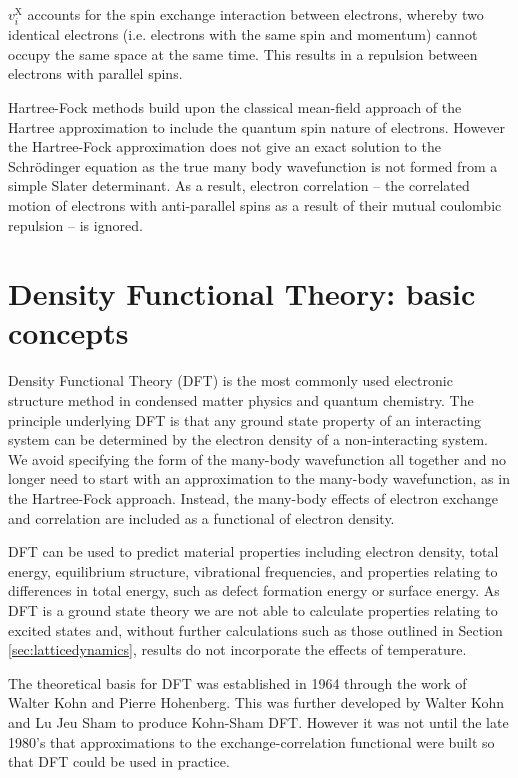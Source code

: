 $v_i^\textrm{X}$ accounts for the spin exchange interaction between electrons, whereby two identical electrons (i.e. electrons with the same spin and momentum) cannot occupy the same space at the same time. This results in a repulsion between electrons with parallel spins.

Hartree-Fock methods build upon the classical mean-field approach of the Hartree approximation to include the quantum spin nature of electrons.
However the Hartree-Fock approximation does not give an exact solution to the Schr\"{o}dinger equation as the true many body wavefunction is not formed from a simple Slater determinant. As a result, electron correlation -- the correlated motion of electrons with anti-parallel spins as a result of their mutual coulombic repulsion -- is ignored.



\section{Density Functional Theory: basic concepts} \label{DFTtheory}

Density Functional Theory (DFT) is the most commonly used electronic structure method in condensed matter physics and quantum chemistry. The principle underlying DFT is that any ground state property of an interacting system can be determined by the electron density of a non-interacting system. We avoid specifying the form of the many-body wavefunction all together and no longer need to start with an approximation to the many-body wavefunction, as in the Hartree-Fock approach. Instead, the many-body effects of electron exchange and correlation are included as a functional of electron density.

DFT can be used to predict material properties including electron density, total energy, equilibrium structure, vibrational frequencies, and properties relating to differences in total energy, such as defect formation energy or surface energy. 
As DFT is a ground state theory we are not able to calculate properties relating to excited states and, without further calculations such as those outlined in Section \ref{sec:latticedynamics}, results do not incorporate the effects of temperature. 

The theoretical basis for DFT was established in 1964 through the work of Walter Kohn and Pierre Hohenberg.\autocite{Hohenberg1964} This was further developed by Walter Kohn and Lu Jeu Sham to produce Kohn-Sham DFT.\autocite{Kohn1965} However it was not until the late 1980's that approximations to the exchange-correlation functional were built so that DFT could be used in practice. 

